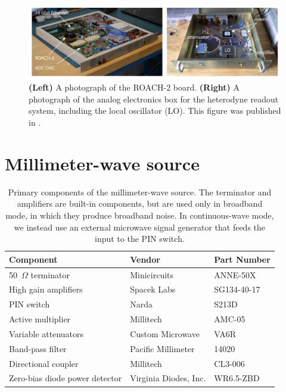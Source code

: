 \begin{figure}[htb]
\centering
\includegraphics[width=\textwidth]{hardware/roach-2_v2.pdf}
\caption[Photographs of the ROACH-2 board and the heterodyne analog electronics box.]
{
\textbf{(Left)}
A photograph of the ROACH-2 board.
\textbf{(Right)}
A photograph of the analog electronics box for the heterodyne readout system, including the local oscillator (LO).
This figure was published in \textcite{Johnson2016SPIE}.
}
\label{fig:roach-2_v2}
\end{figure}

\clearpage


\section{Millimeter-wave source}
\label{sec:hardware.mmw_source}

\begin{table}[htb]
\centering
\caption[Primary components of the millimeter-wave source.]{Primary components of the millimeter-wave source.
The terminator and amplifiers are built-in components, but are used only in broadband mode, in which they produce broadband noise.
In continuous-wave mode, we instead use an external microwave signal generator that feeds the input to the PIN switch.}
\renewcommand{\arraystretch}{1.2}
\begin{tabular}{lll}
\toprule
\textbf{Component} & \textbf{Vendor} & \textbf{Part Number} \\
\midrule
50~$\Omega$ terminator & Minicircuits & ANNE-50X \\ 
High gain amplifiers & Spacek Labs & SG134-40-17 \\ 
PIN switch & Narda & S213D \\ 
Active multiplier & Millitech & AMC-05 \\
Variable attenuators & Custom Microwave & VA6R \\
Band-pass filter & Pacific Millimeter & 14020 \\
Directional coupler & Millitech & CL3-006 \\
Zero-bias diode power detector & Virginia Diodes, Inc. & WR6.5-ZBD \\
\bottomrule
\end{tabular}
\label{tab:mmw_source}
\end{table}

